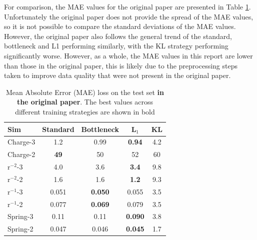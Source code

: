 \documentclass[11pt]{article}
\begin{document}
For comparison, the MAE values for the original paper are presented in Table \ref{tab:mae_table_original}. Unfortunately the original paper does not provide the spread of the MAE values, so it is not possible to compare the standard deviations of the MAE values. However, the original paper also follows the general trend of the standard, bottleneck and L1 performing similarly, with the KL strategy performing significantly worse. However, as a whole, the MAE values in this report are lower than those in the original paper, this is likely due to the preprocessing steps taken to improve data quality that were not present in the original paper.

\begin{table}[H]
    \centering
    \begin{tabular}{lcccc}
    \hline
    Sim & Standard & Bottleneck & L$_1$ & KL \\
    \hline
    Charge-3 & 1.2  & 0.99  & \textbf{0.94}  & 4.2  \\
    Charge-2 & \textbf{49}  & 50  & 52  & 60  \\
    r$^{-2}$-3 & 4.0 & 3.6  & \textbf{3.4} & 9.8  \\
    r$^{-2}$-2 & 1.6  & 1.6  & \textbf{1.2}  & 9.3  \\
    r$^{-1}$-3 & 0.051 & \textbf{0.050}  & 0.055 & 3.5   \\
    r$^{-1}$-2 & 0.077  & \textbf{0.069}  & 0.079  & 3.5   \\
    Spring-3 & 0.11  & 0.11  & \textbf{0.090}  & 3.8  \\
    Spring-2 & 0.047  & 0.046  & \textbf{0.045}  & 1.7  \\
    \hline
    \end{tabular}
    \caption{Mean Absolute Error (MAE) loss on the test set \textbf{in the original paper}. The best values across different training strategies are shown in bold}
    \label{tab:mae_table_original}
    \end{table}
\end{document}
